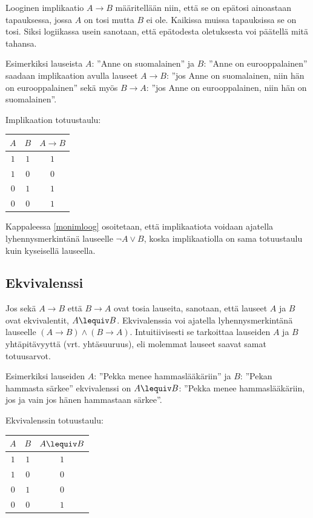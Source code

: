 Looginen implikaatio $A\to B$  määritellään niin, että se on epätosi ainoastaan tapauksessa, jossa $A$ on tosi mutta $B$ ei ole. Kaikissa muissa tapauksissa se on tosi. Siksi logiikassa usein sanotaan, että epätodesta oletuksesta voi päätellä mitä tahansa.


Esimerkiksi lauseista $A$: ''Anne on suomalainen'' ja $B$: ''Anne on eurooppalainen'' saadaan implikaation avulla lauseet $A \to B$: ''jos Anne on suomalainen, niin hän on eurooppalainen'' sekä myös $B \to A$: ''jos Anne on eurooppalainen, niin hän on suomalainen''. 

Implikaation totuustaulu:

\bigskip

\begin{center}
\begin{tabular}{|c|c|c|}\hline
$A$ & $B$ & $A \to B$ \\ \hline
$1$ & $1$ & $1$\\ %
$1$ & $0$ & $0$\\
$0$ & $1$ & $1$\\
$0$ & $0$ & $1$\\ \hline
\end{tabular}
\end{center}

\bigskip

Kappaleessa \ref{monimloog} osoitetaan, että implikaatiota voidaan ajatella lyhennysmerkintänä lauseelle $\lnot A \lor B$, koska implikaatiolla on sama totuustaulu kuin kyseisellä lauseella.


\subsection*{Ekvivalenssi}
Jos sekä $A\to B$ että $B\to A$ ovat tosia lauseita, sanotaan, että lauseet $A$ ja $B$ ovat ekvivalentit, $A \lequiv B$. Ekvivalenssia voi ajatella lyhennysmerkintänä lauseelle $(A\to B) \land (B\to A)$. Intuitiivisesti se tarkoittaa lauseiden $A$ ja $B$ yhtäpitävyyttä (vrt. yhtäsuuruus), eli molemmat lauseet saavat samat totuusarvot.


Esimerkiksi lauseiden $A$: ''Pekka menee hammaslääkäriin'' ja $B$: ''Pekan hammasta särkee'' ekvivalenssi on $A \lequiv B$: ''Pekka menee hammaslääkäriin, jos ja vain jos hänen hammastaan särkee''.

Ekvivalenssin totuustaulu:

\bigskip

\begin{center}
\begin{tabular}{|c|c|c|}\hline
$A$ & $B$ & $A \lequiv  B$ \\ \hline
$1$ & $1$ & $1$\\ %
$1$ & $0$ & $0$\\
$0$ & $1$ & $0$\\
$0$ & $0$ & $1$\\ \hline
\end{tabular}
\end{center}

